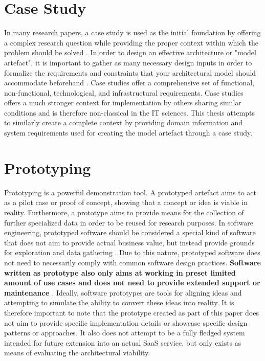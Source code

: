 \section{Case Study}

In many research papers, a case study is used as the initial foundation by offering a complex research question while providing the proper context within which the problem should be solved \cite{Schell1992-cm}. In order to design an effective architecture or "model artefact", it is important to gather as many necessary design inputs in order to formalize the requirements and constraints that your architectural model should accommodate beforehand \cite{Microsoft_Patterns_Practices_Team2009-ek}. Case studies offer a comprehensive set of functional, non-functional, technological, and infrastructural requirements.
Case studies offers a much stronger context for implementation by others sharing similar conditions and is therefore non-classical in the IT sciences. This thesis attempts to similarly create a complete context by providing domain information and system requirements used for creating the model artefact through a case study.


\section{Prototyping}

Prototyping is a powerful demonstration tool. A prototyped artefact aims to act as a pilot case or proof of concept, showing that a concept or idea is viable in reality. Furthermore, a prototype aims to provide means for the collection of further specialized data in order to be reused for research purposes. In software engineering, prototyped software should be considered a special kind of software that does not aim to provide actual business value, but instead provide grounds for exploration and data gathering \cite{Monperrus2013}. Due to this nature, prototyped software does not need to necessarily comply with common software design practices. \textbf{Software written as prototype also only aims at working in preset limited amount of use cases and does not need to provide extended support or maintenance \cite{Monperrus2013}}. Ideally, software prototypes are tools for aligning ideas and attempting to simulate the ability to convert these ideas into reality. It is therefore important to note that the prototype created as part of this paper does not aim to provide specific implementation details or showcase specific design patterns or approaches. It also does not attempt to be a fully fledged system intended for future extension into an actual SaaS service, but only exists as means of evaluating the architectural viability.


